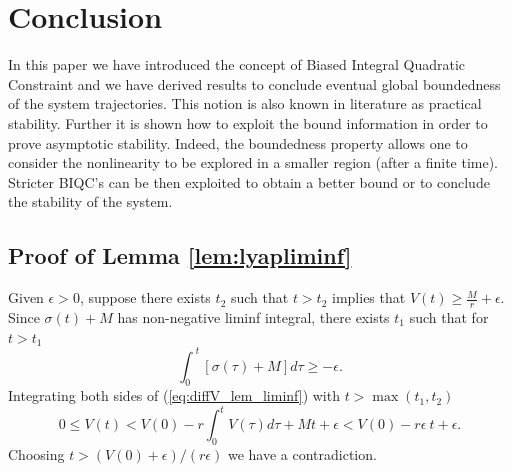 \documentclass[letterpaper,10pt,conference,twocolumn]{IEEEtran}
\newcommand{\eps}{\epsilon}
\begin{document}
\section{Conclusion}
In this paper we have introduced the concept of Biased Integral Quadratic Constraint and we have derived results to conclude eventual global boundedness of the system trajectories.
This notion is also known in literature as practical stability. Further it is shown how to exploit the bound information in order to prove asymptotic stability.
Indeed, the boundedness property allows one to consider the nonlinearity to be explored in a smaller region (after a finite time). Stricter BIQC's can be then exploited to obtain a better bound or to conclude the stability of the system.

\begin{appendix}

\subsection{Proof of Lemma \ref{lem:lyapliminf}}
	Given $\eps>0$, suppose there exists $t_2$ such that $t>t_2$ implies that $V(t)\geq \frac{M}{r}+\eps$.
	Since $\sigma(t)+M$ has non-negative liminf integral,
	there exists $t_1$ such that for $t>t_1$
	\begin{equation*}
		\int_0^{~t}[\sigma(\tau)+M]d\tau\geq -\eps.
	\end{equation*}
	Integrating both sides of (\ref{eq:diffV_lem_liminf}) with $t>\max(t_1,t_2)$
	\begin{equation*}
		0\leq V(t)< V(0)-r\int_{0}^{t}V(\tau)d\tau+Mt+\eps<V(0)-r\eps~t+\eps.
	\end{equation*}
	Choosing $t>(V(0)+\eps)/(r\eps)$ we have a contradiction.


\end{appendix}
\end{document}
